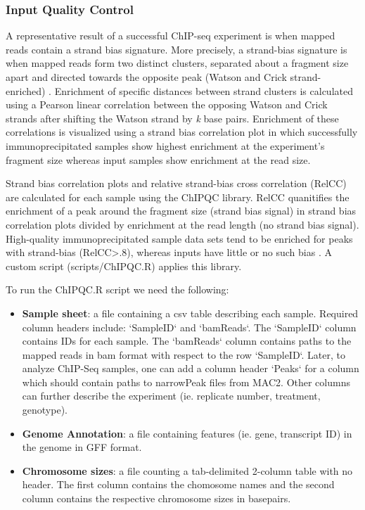 \documentclass{article}
\begin{document}
\begin{sloppypar}
\subsubsection{Input Quality Control}

A representative result of a successful ChIP-seq experiment is when mapped reads contain a strand bias signature. More precisely, a strand-bias signature is when mapped reads form two distinct clusters, separated about a fragment size apart and  directed towards the opposite peak (Watson and Crick strand-enriched) \cite{Landt2012}. Enrichment of specific distances between strand clusters is calculated using a Pearson linear correlation between the opposing Watson and Crick strands after shifting the Watson strand by \textit{k} base pairs. Enrichment of these correlations is visualized using a strand bias correlation plot in which successfully immunoprecipitated samples show highest enrichment at the experiment's fragment size whereas input samples show enrichment at the read size. 


 Strand bias correlation plots and relative strand-bias cross correlation (RelCC) are calculated for each sample using the ChIPQC library. RelCC quanitifies the enrichment of a peak around the fragment size (strand bias signal) in strand bias correlation plots divided by enrichment at the read length (no strand bias signal).  High-quality immunoprecipitated sample data sets tend to be enriched for peaks with strand-bias (RelCC>.8), whereas inputs have little or no such bias \cite{Landt2012}. A custom script ({\selectfont scripts/ChIPQC.R}) applies this library. 
 
To run the ChIPQC.R script we need the following:
\begin{itemize}
  \item \textbf{Sample sheet}: a file containing a csv table describing each sample. Required column headers include: `SampleID` and `bamReads`. The `SampleID` column contains IDs for each sample. The `bamReads` column contains paths to the mapped reads in bam format with respect to the row `SampleID`. Later, to analyze ChIP-Seq samples, one can add a column header `Peaks` for a column which should contain paths to narrowPeak files from MAC2. Other columns can further describe the experiment (ie. replicate number, treatment, genotype).
  \item \textbf{Genome Annotation}: a file containing features (ie. gene, transcript ID) in the genome in GFF format.
  \item \textbf{Chromosome sizes}: a file counting a tab-delimited 2-column table with no header. The first column contains the chomosome names and the second column contains the respective chromosome sizes in basepairs.
\end{itemize}


\end{sloppypar}
\end{document}
